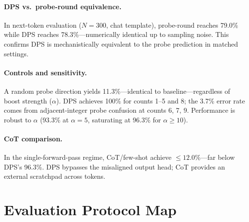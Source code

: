 \documentclass{article}
\begin{document}
\paragraph{DPS vs.\ probe-round equivalence.}
In next-token evaluation ($N=300$, chat template), probe-round reaches 79.0\% while DPS reaches 78.3\%---numerically identical up to sampling noise.
This confirms DPS is mechanistically equivalent to the probe prediction in matched settings.

\paragraph{Controls and sensitivity.}
A random probe direction yields 11.3\%---identical to baseline---regardless of boost strength ($\alpha$).
DPS achieves 100\% for counts 1--5 and 8; the 3.7\% error rate comes from
adjacent-integer probe confusion at counts 6, 7, 9.
Performance is robust to $\alpha$ (93.3\% at $\alpha{=}5$, saturating at 96.3\% for $\alpha \geq 10$).

\paragraph{CoT comparison.}
In the single-forward-pass regime, CoT/few-shot achieve $\leq 12.0\%$---far below DPS's 96.3\%.
DPS bypasses the misaligned output head; CoT provides an external scratchpad across tokens.

\section{Evaluation Protocol Map}
\label{sec:protocol_map}
\end{document}
